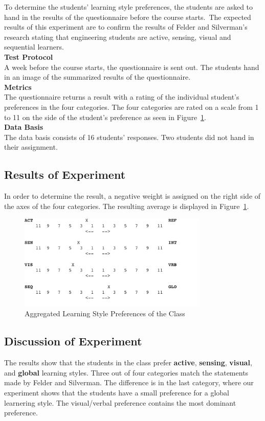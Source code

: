 \noindent 
To determine the students' learning style preferences, the students are asked to hand in the results of the questionnaire before the course starts. The expected results of this experiment are to confirm the results of Felder and Silverman's research stating that engineering students are active, sensing, visual and sequential learners.\\

\noindent\textbf{Test Protocol} \\
A week before the course starts, the questionnaire is sent out. The students hand in an image of the summarized results of the questionnaire. \\

\noindent\textbf{Metrics} \\
The questionnaire returns a result with a rating of the individual student's preferences in the four categories. The four categories are rated on a scale from 1 to 11 on the side of the student's preference as seen in Figure~\ref{fig:learningstyles}.\\

\noindent\textbf{Data Basis}\\
The data basis consists of 16 students' responses. Two students did not hand in their assignment.

\subsection*{Results of Experiment}
In order to determine the result, a negative weight is assigned on the right side of the axes of the four categories. The resulting average is displayed in Figure~\ref{fig:learningstyles}.

\begin{figure}[H]
\centering
\includegraphics[width=9cm]{figures/overall_learning_style}
\caption{Aggregated Learning Style Preferences of the Class}
\label{fig:learningstyles}
\end{figure}

\subsection*{Discussion of Experiment}
The results show that the students in the class prefer \textbf{active},  \textbf{sensing}, \textbf{visual}, and \textbf{global} learning styles. Three out of four categories match the statements made by Felder and Silverman. The difference is in the last category, where our experiment shows that the students have a small preference for a global learnering style. The visual/verbal preference contains the most dominant preference.


